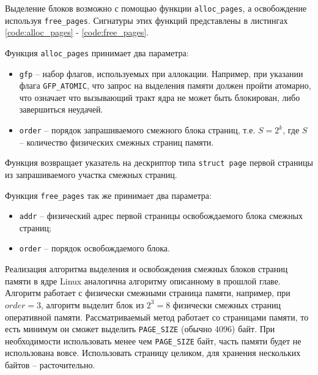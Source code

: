 Выделение блоков возможно с помощью функции \texttt{alloc\_pages}, а освобождение используя \texttt{free\_pages}. Сигнатуры этих функций представлены в листингах \ref{code:alloc_pages} - \ref{code:free_pages}.


Функция \texttt{alloc\_pages} принимает два параметра:

\begin{itemize}
	\item \texttt{gfp} -- набор флагов, используемых при аллокации. Например, при указании флага \texttt{GFP\_ATOMIC}, что запрос на выделения памяти должен пройти атомарно, что означает что вызывающий тракт ядра не может быть блокирован, либо завершиться неудачей.
	\item \texttt{order} -- порядок запрашиваемого смежного блока страниц, т.е. $S = 2^k$, где $S$ -- количество физических смежных страниц памяти.
\end{itemize}

Функция возвращает указатель на дескриптор типа \texttt{struct page} первой страницы из запрашиваемого участка смежных страниц.


Функция \texttt{free\_pages} так же принимает два параметра:

\begin{itemize}
	\item \texttt{addr} -- физический адрес первой страницы освобождаемого блока смежных страниц;
	\item \texttt{order} -- порядок освобождаемого блока.
\end{itemize}

Реализация алгоритма выделения и освобождения смежных блоков страниц памяти в ядре Linux аналогична алгоритму описанному в прошлой главе. Алгоритм работает с физически смежными страница памяти, например, при $order = 3$, алгоритм выделит блок из $2^3 = 8$ физически смежных страниц оперативной памяти. Рассматриваемый метод работает со страницами памяти, то есть минимум он сможет выделить \texttt{PAGE\_SIZE} (обычно 4096) байт. При необходимости использовать менее чем \texttt{PAGE\_SIZE} байт, часть памяти будет не использована вовсе. Использовать страницу целиком, для хранения нескольких байтов -- расточительно.

